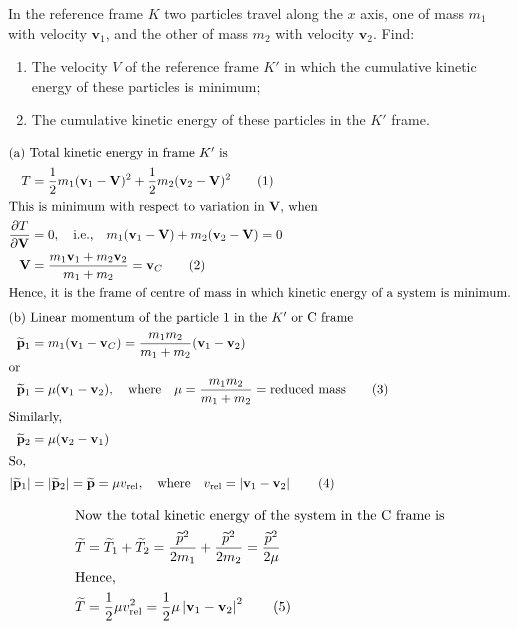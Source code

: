 \item In the reference frame $K$ two particles travel along the $x$ axis, one of mass $m_1$ with velocity $\mathbf{v}_1$, and the other of mass $m_2$ with velocity $\mathbf{v}_2$. Find:
    \begin{enumerate}
        \item The velocity $V$ of the reference frame $K'$ in which the cumulative kinetic energy of these particles is minimum;
        \item The cumulative kinetic energy of these particles in the $K'$ frame.
    \end{enumerate}\begin{solution}

\begin{align*}
    \intertext{(a) Total kinetic energy in frame $K'$ is}
    T &= \dfrac{1}{2} m_1 (\mathbf{v}_1 - \mathbf{V})^2 + \dfrac{1}{2} m_2 (\mathbf{v}_2 - \mathbf{V})^2 \tag{1} \\
    \intertext{This is minimum with respect to variation in $\mathbf{V}$, when}
    \dfrac{\partial T}{\partial \mathbf{V}} &= 0,
    \quad \text{i.e.,} \quad m_1(\mathbf{v}_1 - \mathbf{V}) + m_2(\mathbf{v}_2 - \mathbf{V}) = 0\\
    \mathbf{V} &= \dfrac{m_1 \mathbf{v}_1 + m_2 \mathbf{v}_2}{m_1 + m_2} = \mathbf{v}_C \tag{2} \\
    \intertext{Hence, it is the frame of centre of mass in which kinetic energy of a system is minimum.}
    \intertext{(b) Linear momentum of the particle 1 in the $K'$ or C frame}
    \tilde{\mathbf{p}}_1 &= m_1 (\mathbf{v}_1 - \mathbf{v}_C) = \dfrac{m_1 m_2}{m_1 + m_2} (\mathbf{v}_1 - \mathbf{v}_2)\\
    \intertext{or}
    \tilde{\mathbf{p}}_1 &= \mu (\mathbf{v}_1 - \mathbf{v}_2),
    \quad \text{where} \quad \mu = \dfrac{m_1 m_2}{m_1 + m_2} = \text{reduced mass} \tag{3} \\ \intertext{Similarly,}
    \tilde{\mathbf{p}}_2 &= \mu (\mathbf{v}_2 - \mathbf{v}_1) \\
    \intertext{So,}
    \left| \tilde{\mathbf{p}}_1 \right| &= \left| \tilde{\mathbf{p}}_2 \right| = \tilde{\mathbf{p}} = \mu v_{\text{rel}},
    \quad \text{where} \quad v_{\text{rel}} = \left| \mathbf{v}_1 - \mathbf{v}_2 \right| \tag{4}
\end{align*}

\begin{align*}
    \intertext{Now the total kinetic energy of the system in the C frame is}
    \tilde{T} &= \tilde{T}_1 + \tilde{T}_2 = \dfrac{\tilde{p}^2}{2m_1} + \dfrac{\tilde{p}^2}{2m_2} = \dfrac{\tilde{p}^2}{2\mu}\\
    \intertext{Hence,}
    \tilde{T} &= \dfrac{1}{2} \mu v_{\text{rel}}^2 = \dfrac{1}{2} \mu \left| \mathbf{v}_1 - \mathbf{v}_2 \right|^2 \tag{5}
\end{align*}

\end{solution}